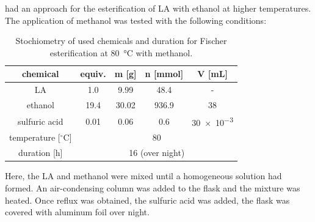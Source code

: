 \documentclass[11pt]{scrreport}
\let\cite=\supercite
\begin{document}
	\citeauthor{koelbl_greener_2025} had an approach for the esterification of \gls{LA} with ethanol at higher temperatures. The application of methanol was tested with the following conditions:\cite{koelbl_greener_2025}
	\begin{table}[H]
		\centering
		\caption[Used chemicals and duration for Fischer esterification at \SI{80}{\degreeCelsius} with methanol.]{\centering Stochiometry of used chemicals and duration for Fischer esterification at \SI{80}{\degreeCelsius} with methanol.}
		\begin{tabular}{|c|cccc|}
			\hline
			\textbf{chemical} & \multicolumn{1}{c|}{\textbf{equiv.}} & \multicolumn{1}{c|}{\textbf{m [g]}} & \multicolumn{1}{c|}{\textbf{n [mmol]}} & \textbf{V [mL]} \\ \hline
			\gls{LA} & \multicolumn{1}{c|}{1.0} & \multicolumn{1}{c|}{9.99} & \multicolumn{1}{c|}{48.4} & - \\ \hline
			ethanol & \multicolumn{1}{c|}{19.4} & \multicolumn{1}{c|}{30.02} & \multicolumn{1}{c|}{936.9} & 38 \\ \hline
			sulfuric acid & \multicolumn{1}{c|}{0.01} & \multicolumn{1}{c|}{0.06} & \multicolumn{1}{c|}{0.6} & \num{30e-3} \\ \hhline{|=|=|=|=|=|}
			temperature [$^\circ\mathrm{C}$] & \multicolumn{4}{c|}{80} \\ \hline
			duration [h] & \multicolumn{4}{c|}{16 (over night)} \\ \hline
		\end{tabular}
	\end{table}\noindent
	Here, the \gls{LA} and methanol were mixed until a homogeneous solution had formed. An air-condensing column was added to the flask and the mixture was heated. Once reflux was obtained, the sulfuric acid was added, the flask was covered with aluminum foil over night.\\ 
\end{document}
